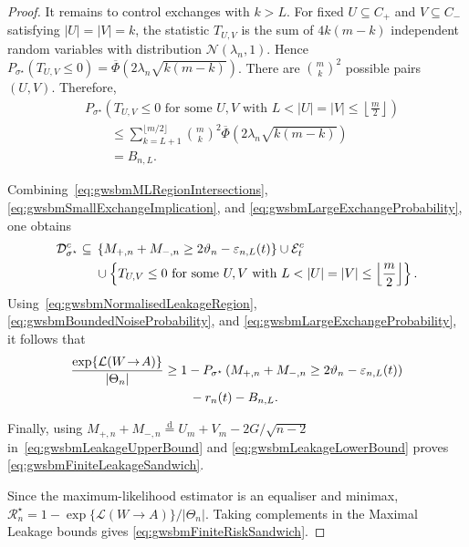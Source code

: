 \documentclass[10pt,a4paper]{amsart}
\newcommand{\ml}[2]{\mathcal{L}(#1\!\to\!#2)}
\begin{document}
\begin{proof}
It remains to control exchanges with $k>L$. For fixed
$U\subseteq C_+$ and $V\subseteq C_-$ satisfying
$|U|=|V|=k$, the statistic $T_{U,V}$ is the sum of
$4k(m-k)$ independent random variables with distribution
$\mathcal N(\lambda_n,1)$. Hence
\(P_{\sigma^\star}(T_{U,V}\leq0)
=\overline\Phi(2\lambda_n\sqrt{k(m-k)})\).
There are $\binom{m}{k}^2$ possible pairs $(U,V)$. Therefore,
\begin{align}
&P_{\sigma^\star}
\left(
T_{U,V}\leq0
\text{ for some }
U,V
\text{ with }
L<|U|=|V|
\leq
\left\lfloor\frac m2\right\rfloor
\right)\\
&\qquad\leq
\sum_{k=L+1}^{\lfloor m/2\rfloor}
\binom{m}{k}^2
\overline\Phi
\left(
2\lambda_n\sqrt{k(m-k)}
\right)\\
&\qquad=
B_{n,L}.
\label{eq:gwsbmLargeExchangeProbability}
\end{align}

Combining~\eqref{eq:gwsbmMLRegionIntersections},
\eqref{eq:gwsbmSmallExchangeImplication}, and
\eqref{eq:gwsbmLargeExchangeProbability}, one obtains
\begin{align}
\mathcal D_{\sigma^\star}^c
\subseteq{}&
\left\{
M_{+,n}+M_{-,n}
\geq
2\vartheta_n-\varepsilon_{n,L}(t)
\right\}
\cup
\mathcal E_t^c
\notag\\
&\cup
\left\{
T_{U,V}\leq0
\text{ for some }
U,V
\text{ with }
L<|U|=|V|
\leq
\left\lfloor\frac m2\right\rfloor
\right\}.
\end{align}
Using~\eqref{eq:gwsbmNormalisedLeakageRegion},
\eqref{eq:gwsbmBoundedNoiseProbability}, and
\eqref{eq:gwsbmLargeExchangeProbability}, it follows that
\begin{align}
\frac{\exp\{\ml{W}{A}\}}{|\Theta_n|}
&\geq
1-
P_{\sigma^\star}
\left(
M_{+,n}+M_{-,n}
\geq
2\vartheta_n-\varepsilon_{n,L}(t)
\right)
\notag\\
&\qquad
-r_n(t)-B_{n,L}.
\label{eq:gwsbmLeakageLowerBound}
\end{align}

Finally, using
\(M_{+,n}+M_{-,n}\overset{\mathrm d}{=}
U_m+V_m-2G/\sqrt{n-2}\)
in~\eqref{eq:gwsbmLeakageUpperBound} and
\eqref{eq:gwsbmLeakageLowerBound} proves
\eqref{eq:gwsbmFiniteLeakageSandwich}.

Since the maximum-likelihood estimator is an equaliser and minimax,
\(\mathcal R_n^\star
=1-\exp\{\ml{W}{A}\}/|\Theta_n|\).
Taking complements in the Maximal Leakage bounds gives
\eqref{eq:gwsbmFiniteRiskSandwich}.
\end{proof}
\end{document}

